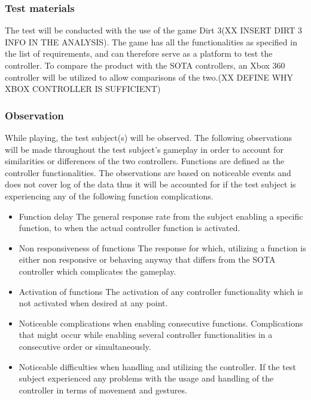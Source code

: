 \subsubsection{Test materials}
The test will be conducted with the use of the game Dirt 3(XX INSERT DIRT 3 INFO IN THE ANALYSIS). 
The game has all the functionalities as specified in the list of requirements, and can therefore serve as a platform to test the controller.
To compare the product with the SOTA controllers, an Xbox 360 controller will be utilized to allow comparisons of the two.(XX DEFINE WHY XBOX CONTROLLER IS SUFFICIENT)

\subsubsection{Observation}
While playing, the test subject(s) will be observed. 
The following observations will be made throughout the test subject’s gameplay in order to account for similarities or differences of the two controllers. 
Functions are defined as the controller functionalities. 
The observations are based on noticeable events and does not cover log of the data thus it will be accounted for if the test subject is experiencing any of the following function complications.

\begin{itemize}
	\item Function delay\newline
		The general response rate from the subject enabling a specific function, to when the actual controller function is 				activated.
	\item Non responsiveness of functions\newline
		The response for which, utilizing a function is either non responsive or behaving anyway that differs from the SOTA 			controller which complicates the gameplay.
	\item Activation of functions\newline
		The activation of any controller functionality which is not activated when desired at any point.
	\item Noticeable complications when enabling consecutive functions.\newline
		Complications that might occur while enabling several controller functionalities in a consecutive order or 						simultaneously.
	\item Noticeable difficulties when handling and utilizing the controller.\newline
		If the test subject experienced any problems with the usage and handling of the controller in terms of movement and 			gestures.
\end{itemize}


